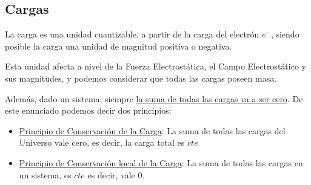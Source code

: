 
\subsection{Cargas}
La carga es una unidad cuantizable, a partir de la carga del electrón \(e^{-}\),  siendo posible la carga una unidad de magnitud positiva o negativa. \par
Esta unidad afecta a nivel de la Fuerza Electrostática, el Campo Electrostático y sus magnitudes, y podemos considerar que todas las cargas poseen masa. \par
Además, dado un sistema, siempre \underline{la suma de todas las cargas va a ser cero}. De este enunciado podemos decir dos principios:


\begin{itemize}
        \item \underline{Principio de Conservación de la Carga}: La suma de todas las cargas del Universo vale cero, es decir, la carga total es \(cte\)
        \item \underline{Principio de Conservación local de la Carga}: La suma de todas las cargas en un sistema, es \(cte\) es decir, vale 0.
\end{itemize}
